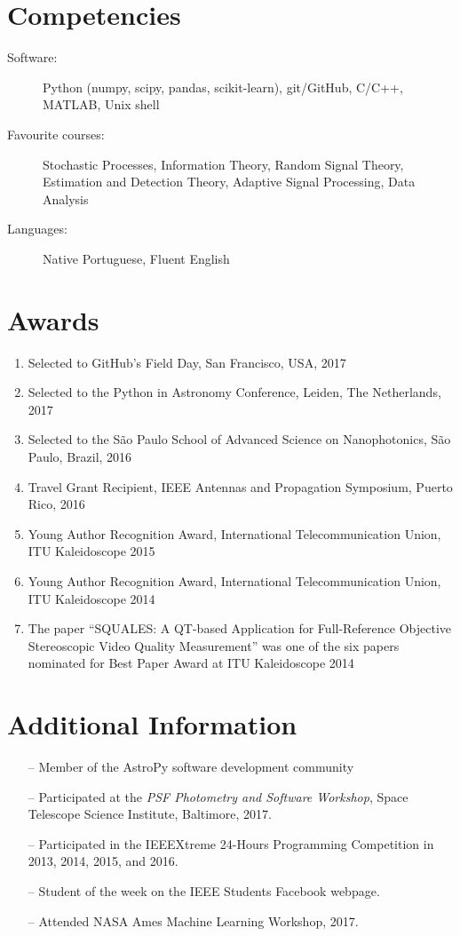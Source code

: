 \documentclass[10pt]{article}
\begin{document}
\begin{titlepage}
\section*{Competencies}
\begin{description}
    \item[Software:] Python (numpy, scipy, pandas, scikit-learn), git/GitHub, C/C++, MATLAB, Unix shell
    \item[Favourite courses:] Stochastic Processes, Information Theory, Random Signal Theory, Estimation and Detection Theory, Adaptive Signal Processing, Data Analysis
    \item[Languages:] Native Portuguese, Fluent English
\end{description}

\section*{Awards}
\begin{enumerate}
  \item Selected to GitHub's Field Day, San Francisco, USA, 2017
  \item Selected to the Python in Astronomy Conference, Leiden, The Netherlands, 2017
  \item Selected to the S\~ao Paulo School of Advanced Science on Nanophotonics, S\~ao Paulo, Brazil, 2016
  \item Travel Grant Recipient, IEEE Antennas and Propagation Symposium, Puerto Rico, 2016
  \item Young Author Recognition Award, International Telecommunication Union, ITU Kaleidoscope 2015
  \item Young Author Recognition Award, International Telecommunication Union, ITU Kaleidoscope 2014
  \item The paper ``SQUALES: A QT-based Application for Full-Reference Objective Stereoscopic Video Quality Measurement'' was one of the six papers nominated for Best Paper Award at ITU Kaleidoscope 2014
\end{enumerate}

\section*{Additional Information}
\begin{itemize}
    \item[--] Member of the AstroPy software development community
    \item[--] Participated at the \textit{PSF Photometry and Software Workshop}, Space Telescope Science Institute, Baltimore, 2017.
    \item[--] Participated in the IEEEXtreme 24-Hours Programming Competition in 2013, 2014, 2015, and 2016.
    \item[--] Student of the week on the IEEE Students Facebook webpage.
    \item[--] Attended NASA Ames Machine Learning Workshop, 2017.
\end{itemize}

\end{titlepage}
\end{document}
